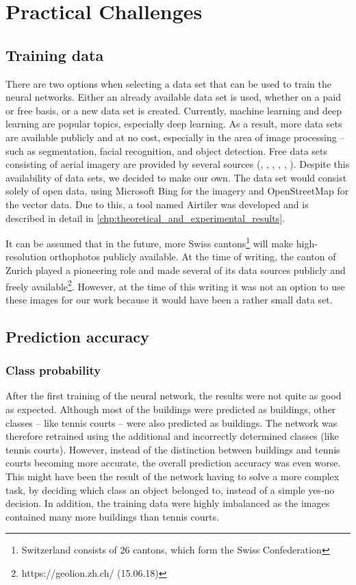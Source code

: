 
\chapter{Practical Challenges}\label{chp:practical_challenges}

\section{Training data}
There are two options when selecting a data set that can be used to train the neural networks. Either an already available data set is used, whether on a paid or free basis, or a new data set is created. Currently, machine learning and deep learning are popular topics, especially deep learning. As a result, more data sets are available publicly and at no cost, especially in the area of image processing – such as segmentation, facial recognition, and object detection. Free data sets consisting of aerial imagery are provided by several sources (\cite{VolodymyrMnih.2013}, \cite{spacenet}, \cite{isprs-vaihingen}, \cite{isprs-potsdam}, \cite{Helber.20170831}, \cite{deepsat}).
Despite this availability of data sets, we decided to make our own. The data set would consist solely of open data, using Microsoft Bing for the imagery and OpenStreetMap for the vector data. Due to this, a tool named Airtiler \cite{airtiler} was developed and is described in detail in \autoref{chp:theoretical_and_experimental_results}.

It can be assumed that in the future, more Swiss cantons\footnote{Switzerland consists of 26 cantons, which form the Swiss Confederation} will make high-resolution orthophotos publicly available. At the time of writing, the canton of Zurich played a pioneering role and made several of its data sources publicly and freely available\footnote{https://geolion.zh.ch/ (15.06.18)}. However, at the time of this writing it was not an option to use these images for our work because it would have been a rather small data set.


\section{Prediction accuracy}

\subsection{Class probability}
After the first training of the neural network, the results were not quite as good as expected. Although most of the buildings were predicted as buildings, other classes – like tennis courts – were also predicted as buildings. The network was therefore retrained using the additional and incorrectly determined classes (like tennis courts). However, instead of the distinction between buildings and tennis courts becoming more accurate, the overall prediction accuracy was even worse. This might have been the result of the network having to solve a more complex task, by deciding which class an object belonged to, instead of a simple yes-no decision. In addition, the training data were highly imbalanced as the images contained many more buildings than tennis courts.

